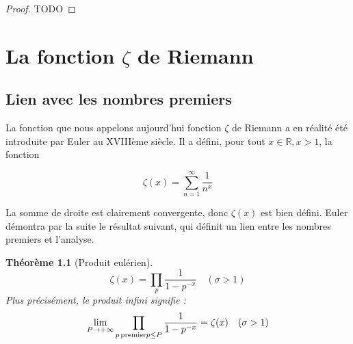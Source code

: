\documentclass[french]{report}
\newtheorem{theorem}{Théorème}[section]
\begin{document}
\begin{proof}
  TODO
\end{proof}

\chapter{La fonction $\zeta$ de Riemann}

\section{Lien avec les nombres premiers}

La fonction que nous appelons aujourd'hui fonction $\zeta$ de Riemann a en réalité été introduite par Euler au XVIIIème siècle. Il a défini, pour tout $x\in\mathbb{R}, x>1$, la fonction

\[ \zeta(x) = \sum_{n=1}^{\infty}\frac{1}{n^x} \]

La somme de droite est clairement convergente, donc $\zeta(x)$ est bien défini. Euler démontra par la suite le résultat suivant, qui définit un lien entre les nombres premiers et l'analyse.

\begin{theorem}[Produit eulérien]\label{thm:produit-eulerien-reel}
  \[ \zeta(x) = \prod_p\frac{1}{1-p^{-x}}\quad(\sigma>1) \]
  Plus précisément, le produit infini signifie :
  \[ \lim_{P\to+\infty}\prod_{p\,\mathrm{premier}\\p\leq P}\frac{1}{1-p^{-x}}=\zeta(x)\quad(\sigma>1) \]
\end{theorem}
\end{document}
